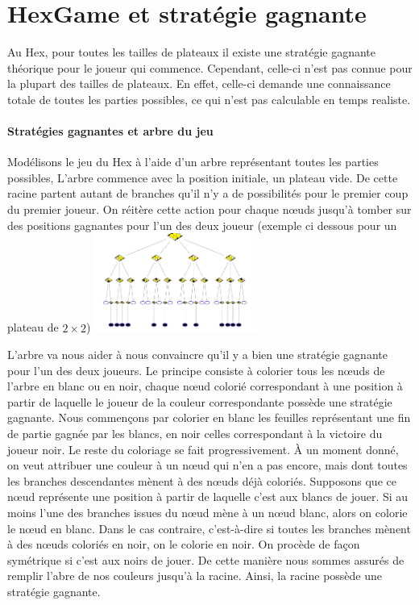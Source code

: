 \section{HexGame et stratégie gagnante}

Au Hex, pour toutes les tailles de plateaux il existe une stratégie gagnante théorique pour le joueur qui commence.
Cependant, celle-ci n'est pas connue pour la plupart des tailles de plateaux. En effet, celle-ci demande une connaissance totale de toutes 
les parties possibles, ce qui n'est pas calculable en temps realiste.

\paragraph{Stratégies gagnantes et arbre du jeu}
Modélisons le jeu du Hex à l'aide d'un arbre représentant toutes les parties possibles, L'arbre commence avec la position 
initiale, un plateau vide. De cette racine partent autant de branches qu'il n'y a de possibilités pour 
le premier coup du premier joueur. On réitère cette action pour chaque nœuds jusqu'à tomber sur des positions gagnantes pour l'un des deux joueur
(exemple ci dessous pour un plateau de $2\times2$)
\includegraphics[width=0.4\textwidth]{root/strategie_gagnante.png}

L'arbre va nous aider à nous convaincre qu'il y a bien une stratégie gagnante pour l'un des deux joueurs. 
Le principe consiste à colorier tous les nœuds de l'arbre en blanc ou en noir, chaque
nœud colorié correspondant à une position à partir de laquelle le joueur de la couleur correspondante
possède une stratégie gagnante. 
Nous commençons par colorier en blanc les feuilles représentant une fin de
partie gagnée par les blancs, en noir celles correspondant à la victoire du joueur noir.
Le reste du coloriage se fait progressivement. À un moment donné, on veut attribuer une couleur
à un nœud qui n'en a pas encore, mais dont toutes les branches descendantes mènent à des nœuds
déjà coloriés. Supposons que ce nœud représente une position à partir de laquelle c'est aux blancs de
jouer. Si au moins l'une des branches issues du nœud mène à un nœud blanc, alors on colorie le nœud
en blanc. Dans le cas contraire, c'est-à-dire si toutes les branches mènent à des nœuds coloriés en
noir, on le colorie en noir. On procède de façon symétrique si c'est aux noirs de jouer.
De cette manière nous sommes assurés de remplir l'abre de nos couleurs jusqu'à la racine. 
Ainsi, la racine possède une stratégie gagnante.



